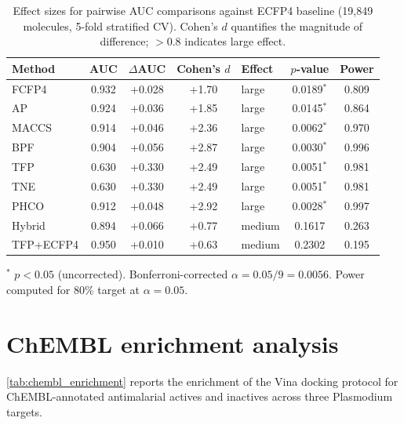 \documentclass[11pt,a4paper]{article}
\begin{document}
\begin{table}[ht!]
	\centering
	\caption{Effect sizes for pairwise AUC comparisons against ECFP4 baseline (19,849 molecules, 5-fold stratified CV). Cohen's $d$ quantifies the magnitude of difference; $>0.8$ indicates large effect.}
	\label{SM-tab:effect_sizes}
	\begin{tabularx}{\textwidth}{l S[table-format=1.3] S[table-format=+1.3] S[table-format=+1.2] l S[table-format=1.4] S[table-format=1.3]}
		\toprule
		Method & {AUC} & {$\Delta$AUC} & {Cohen's $d$} & {Effect} & {$p$-value} & {Power} \\
		\midrule
		FCFP4 & 0.932 & +0.028 & +1.70 & large & 0.0189$^{*}$ & 0.809 \\
		AP & 0.924 & +0.036 & +1.85 & large & 0.0145$^{*}$ & 0.864 \\
		MACCS & 0.914 & +0.046 & +2.36 & large & 0.0062$^{*}$ & 0.970 \\
		BPF & 0.904 & +0.056 & +2.87 & large & 0.0030$^{*}$ & 0.996 \\
		TFP & 0.630 & +0.330 & +2.49 & large & 0.0051$^{*}$ & 0.981 \\
		TNE & 0.630 & +0.330 & +2.49 & large & 0.0051$^{*}$ & 0.981 \\
		PHCO & 0.912 & +0.048 & +2.92 & large & 0.0028$^{*}$ & 0.997 \\
		Hybrid & 0.894 & +0.066 & +0.77 & medium & 0.1617 & 0.263 \\
		TFP+ECFP4 & 0.950 & +0.010 & +0.63 & medium & 0.2302 & 0.195 \\
		\bottomrule
	\end{tabularx}
	\vspace{1mm}
	\footnotesize $^{*}$ $p < 0.05$ (uncorrected). Bonferroni-corrected $\alpha = 0.05/9 = 0.0056$. Power computed for 80\% target at $\alpha = 0.05$.
\end{table}




\section{ChEMBL enrichment analysis}
\label{sec:chembl_enrichment}

\cref{tab:chembl_enrichment} reports the enrichment of the Vina docking protocol for ChEMBL-annotated antimalarial actives and inactives across three Plasmodium targets.
\end{document}
